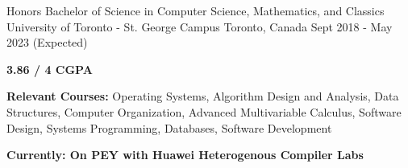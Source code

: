 

\begin{cventries}
  \cventry
  {Honors Bachelor of Science in Computer Science, Mathematics, and Classics} %
  {University of Toronto - St. George Campus} %
  {Toronto, Canada} %
  {Sept 2018 - May 2023 (Expected)} %
  {
    \begin{cvitems} %
      \item {\textbf{3.86 / 4 CGPA}}
      \item {\textbf{Relevant Courses:} Operating Systems, Algorithm Design and Analysis, Data Structures, Computer Organization, Advanced Multivariable Calculus, Software Design, Systems Programming, Databases, Software Development}
      \item {\textbf{Currently: On PEY with Huawei Heterogenous Compiler Labs}}
    \end{cvitems}
  }

\end{cventries}
